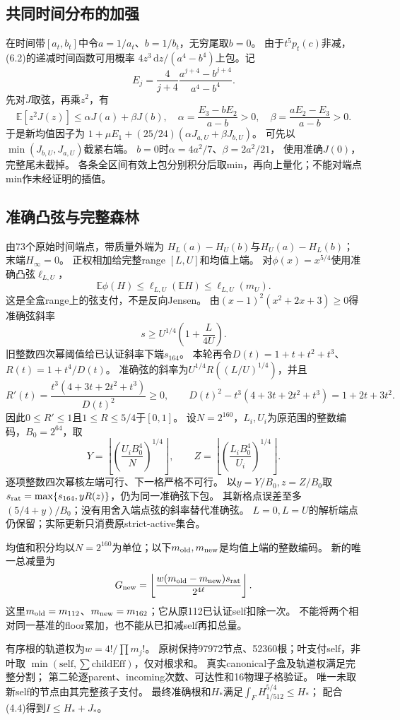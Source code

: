 \documentclass[UTF8,fontset=fandol,zihao=-4,a4paper]{ctexart}
\newcommand{\E}{\mathbb E}
\newcommand{\1}{\mathbf 1}
\newcommand{\dd}{\,\mathrm d}
\begin{document}
\subsection{共同时间分布的加强}
在时间带$[a_t,b_t]$中令$a=1/a_t$、$b=1/b_t$，无穷尾取$b=0$。
由于$t^5p_t(c)$非减，(6.2)的递减时间函数可用概率
$4z^3\dd z/(a^4-b^4)$上包。记
\[
 E_j=\frac4{j+4}\frac{a^{j+4}-b^{j+4}}{a^4-b^4}.
\]
先对$J$取弦，再乘$z^2$，有
\[
 \E[z^2J(z)]\le\alpha J(a)+\beta J(b),\quad
 \alpha=\frac{E_3-bE_2}{a-b}>0,\quad
 \beta=\frac{aE_2-E_3}{a-b}>0.                         \tag{6.3}
\]
于是新均值因子为
$1+\mu E_1+(25/24)(\alpha J_{a,U}+\beta J_{b,U})$。
可先以$\min(J_{b,U},J_{a,U})$截紧右端。
$b=0$时$\alpha=4a^2/7$、$\beta=2a^2/21$，
使用准确$J(0)$，完整尾未截掉。
各条全区间有效上包分别积分后取min，再向上量化；不能对端点min作未经证明的插值。

\subsection{准确凸弦与完整森林}
由73个原始时间端点，带质量外端为
$H_L(a)-H_U(b)$与$H_U(a)-H_L(b)$；末端$H_\infty=0$。
正权相加给完整range $[L,U]$和均值上端。
对$\phi(x)=x^{5/4}$使用准确凸弦$\ell_{L,U}$，
\[
 \E\phi(H)\le\ell_{L,U}(\E H)\le\ell_{L,U}(m_U).
\]
这是全盒range上的弦支付，不是反向Jensen。
由$(x-1)^2(x^2+2x+3)\ge0$得准确弦斜率
\[
 s\ge U^{1/4}\left(1+\frac L{4U}\right).
\]
旧整数四次幂阈值给已认证斜率下端$s_{164}$。
本轮再令$D(t)=1+t+t^2+t^3$、$R(t)=1+t^4/D(t)$。
准确弦的斜率为$U^{1/4}R((L/U)^{1/4})$，并且
\[
 R'(t)=\frac{t^3(4+3t+2t^2+t^3)}{D(t)^2}\ge0,\qquad
 D(t)^2-t^3(4+3t+2t^2+t^3)=1+2t+3t^2.
\]
因此$0\le R'\le1$且$1\le R\le5/4$于$[0,1]$。
设$N=2^{160}$，$L_i,U_i$为原范围的整数编码，$B_0=2^{64}$，取
\[
 Y=\left\lfloor\left(\frac{U_iB_0^4}{N}\right)^{1/4}\right\rfloor,
 \qquad
 Z=\left\lfloor\left(\frac{L_iB_0^4}{U_i}\right)^{1/4}\right\rfloor.
\]
逐项整数四次幂核左端可行、下一格严格不可行。
以$y=Y/B_0,z=Z/B_0$取
$s_{\rm rat}=\max\{s_{164},yR(z)\}$，仍为同一准确弦下包。
其新格点误差至多$(5/4+y)/B_0$；没有用舍入端点弦的斜率替代准确弦。
$L=0,L=U$的解析端点仍保留；实际更新只消费原strict-active集合。

均值和积分均以$N=2^{160}$为单位；以下$m_{\rm old},m_{\rm new}$是均值上端的整数编码。
新的唯一总减量为
\[
 G_{\rm new}=\left\lfloor
 \frac{w(m_{\rm old}-m_{\rm new})s_{\rm rat}}{2^{4\ell}}\right\rfloor.
\]
这里$m_{\rm old}=m_{112}$、$m_{\rm new}=m_{162}$；它从原112已认证self扣除一次。
不能将两个相对同一基准的floor累加，也不能从已扣减self再扣总量。

有序根的轨道权为$w=4!/\prod m_j!$。
原树保持97972节点、52360根；叶支付self，非叶取
$\min(\mathrm{self},\sum\mathrm{childEff})$，仅对根求和。
真实canonical子盒及轨道权满足完整分割；
第二轮逐parent、incoming次数、可达性和16物理子格验证。
唯一未取新self的节点由其完整孩子支付。
最终准确根和$H_*$满足$\int_FH_{1/512}^{5/4}\le H_*$；
配合(4.4)得到$I\le H_*+J_*$。
\end{document}
